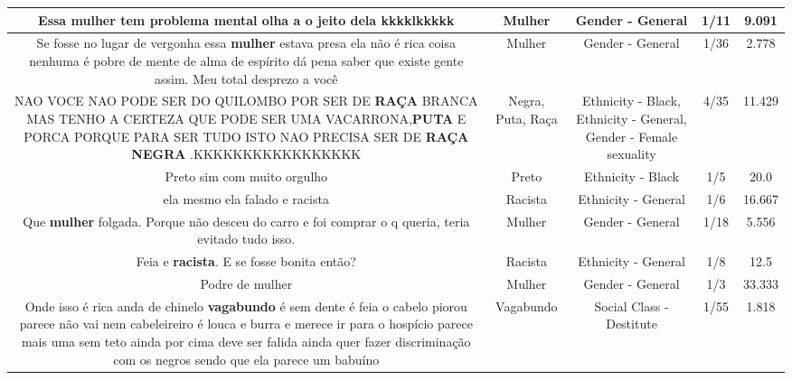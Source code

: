 \documentclass[11pt]{article}
\newlength\mylength
\begin{document}
\begin{center}
\begin{longtable}{|C{.65\mylength}|C{.30\mylength}|C{.12\mylength}|C{.12\mylength}|C{.12\mylength}|}
  \small Essa \textbf{mulher} tem problema mental olha a o jeito dela kkkklkkkkk\normalsize   & Mulher & Gender - General & 1/11 & 9.091 \\  \hline
  \small Se fosse no lugar de vergonha essa \textbf{mulher} estava presa ela não é rica coisa nenhuma é pobre de mente de alma de espírito dá pena saber que existe gente assim. Meu total desprezo a você\normalsize   & Mulher & Gender - General & 1/36 & 2.778 \\  \hline
  \small NAO VOCE NAO PODE SER DO QUILOMBO POR SER DE \textbf{RAÇA} BRANCA MAS TENHO A CERTEZA QUE PODE SER UMA  VACARRONA,\textbf{PUTA} E PORCA PORQUE PARA  SER TUDO ISTO NAO PRECISA SER DE \textbf{RAÇA} \textbf{NEGRA} .KKKKKKKKKKKKKKKKK\normalsize   & Negra, Puta, Raça & Ethnicity - Black, Ethnicity - General, Gender - Female sexuality & 4/35 & 11.429 \\  \hline
  \small Preto sim com muito orgulho\normalsize   & Preto & Ethnicity - Black & 1/5 & 20.0 \\  \hline
  \small ela mesmo ela falado e racista\normalsize   & Racista & Ethnicity - General & 1/6 & 16.667 \\  \hline
  \small Que \textbf{mulher} folgada. Porque não desceu do carro e foi comprar o q queria, teria evitado tudo isso.\normalsize   & Mulher & Gender - General & 1/18 & 5.556 \\  \hline
  \small Feia e \textbf{racista}. E se fosse bonita então?\normalsize   & Racista & Ethnicity - General & 1/8 & 12.5 \\  \hline
  \small Podre de mulher\normalsize   & Mulher & Gender - General & 1/3 & 33.333 \\  \hline
  \small Onde isso é rica anda  de chinelo \textbf{vagabundo} é sem dente é feia o cabelo piorou  parece  não vai nem cabeleireiro é louca e burra e merece ir para o hospício parece mais uma sem  teto  ainda por cima deve ser  falida ainda quer  fazer discriminação com os negros sendo que ela parece um babuíno\normalsize   & Vagabundo & Social Class - Destitute & 1/55 & 1.818 \\  \hline

\end{longtable}
\end{center}
\end{document}
